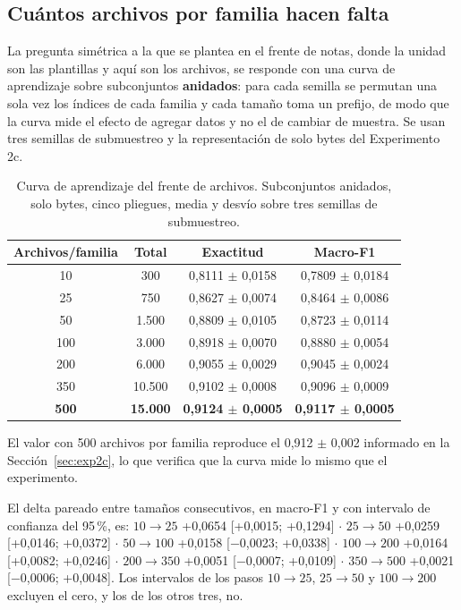 \subsection{Cuántos archivos por familia hacen falta}
\label{subsec:exp2c_curva}

La pregunta simétrica a la que se plantea en el frente de notas, donde la unidad son las plantillas y aquí son los archivos, se responde con una curva de aprendizaje sobre subconjuntos \textbf{anidados}: para cada semilla se permutan una sola vez los índices de cada familia y cada tamaño toma un prefijo, de modo que la curva mide el efecto de agregar datos y no el de cambiar de muestra. Se usan tres semillas de submuestreo y la representación de solo bytes del Experimento 2c.

\begin{table}[ht]
\centering
\caption{Curva de aprendizaje del frente de archivos. Subconjuntos anidados, solo bytes, cinco pliegues, media y desvío sobre tres semillas de submuestreo.}
\label{tab:curva_archivos}
\begin{tabular}{|c|c|c|c|}
\hline
\textbf{Archivos/familia} & \textbf{Total} & \textbf{Exactitud} & \textbf{Macro-F1} \\
\hline
10 & 300 & 0,8111 $\pm$ 0,0158 & 0,7809 $\pm$ 0,0184 \\
25 & 750 & 0,8627 $\pm$ 0,0074 & 0,8464 $\pm$ 0,0086 \\
50 & 1.500 & 0,8809 $\pm$ 0,0105 & 0,8723 $\pm$ 0,0114 \\
100 & 3.000 & 0,8918 $\pm$ 0,0070 & 0,8880 $\pm$ 0,0054 \\
200 & 6.000 & 0,9055 $\pm$ 0,0029 & 0,9045 $\pm$ 0,0024 \\
350 & 10.500 & 0,9102 $\pm$ 0,0008 & 0,9096 $\pm$ 0,0009 \\
\textbf{500} & \textbf{15.000} & \textbf{0,9124 $\pm$ 0,0005} & \textbf{0,9117 $\pm$ 0,0005} \\
\hline
\end{tabular}
\end{table}

El valor con 500 archivos por familia reproduce el 0,912 $\pm$ 0,002 informado en la Sección~\ref{sec:exp2c}, lo que verifica que la curva mide lo mismo que el experimento.

El delta pareado entre tamaños consecutivos, en macro-F1 y con intervalo de confianza del 95\,\%, es: $10\to25$ +0,0654 [+0,0015; +0,1294] $\cdot$ $25\to50$ +0,0259 [+0,0146; +0,0372] $\cdot$ $50\to100$ +0,0158 [$-$0,0023; +0,0338] $\cdot$ $100\to200$ +0,0164 [+0,0082; +0,0246] $\cdot$ $200\to350$ +0,0051 [$-$0,0007; +0,0109] $\cdot$ $350\to500$ +0,0021 [$-$0,0006; +0,0048]. Los intervalos de los pasos $10\to25$, $25\to50$ y $100\to200$ excluyen el cero, y los de los otros tres, no.

